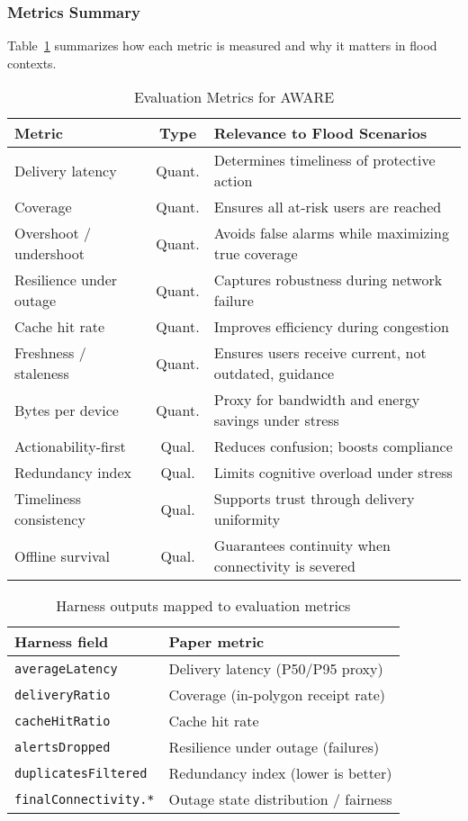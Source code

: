 \documentclass[11pt,twocolumn]{article}
\begin{document}
\subsubsection{Metrics Summary}
Table~\ref{tab:metrics} summarizes how each metric is measured and why it matters in flood contexts.

\begin{table}[t]
\centering
\footnotesize
\caption{Evaluation Metrics for AWARE}
\label{tab:metrics}
\begin{tabularx}{\linewidth}{@{}l c X@{}}
\toprule
\textbf{Metric} & \textbf{Type} & \textbf{Relevance to Flood Scenarios} \\ \midrule
Delivery latency & Quant. & Determines timeliness of protective action \\
Coverage & Quant. & Ensures all at-risk users are reached \\
Overshoot / undershoot & Quant. & Avoids false alarms while maximizing true coverage \\
Resilience under outage & Quant. & Captures robustness during network failure \\
Cache hit rate & Quant. & Improves efficiency during congestion \\
Freshness / staleness & Quant. & Ensures users receive current, not outdated, guidance \\
Bytes per device & Quant. & Proxy for bandwidth and energy savings under stress \\
Actionability-first & Qual. & Reduces confusion; boosts compliance \\
Redundancy index & Qual. & Limits cognitive overload under stress \\
Timeliness consistency & Qual. & Supports trust through delivery uniformity \\
Offline survival & Qual. & Guarantees continuity when connectivity is severed \\
\bottomrule
\end{tabularx}
\vspace{-4pt}
\end{table}


\begin{table}[t]
\centering
\footnotesize
\caption{Harness outputs mapped to evaluation metrics}
\label{tab:harness-mapping}
\begin{tabular}{@{}l l@{}}
\toprule
Harness field & Paper metric \\ \midrule
\texttt{averageLatency} & Delivery latency (P50/P95 proxy) \\
\texttt{deliveryRatio} & Coverage (in-polygon receipt rate) \\
\texttt{cacheHitRatio} & Cache hit rate \\
\texttt{alertsDropped} & Resilience under outage (failures) \\
\texttt{duplicatesFiltered} & Redundancy index (lower is better) \\
\texttt{finalConnectivity.*} & Outage state distribution / fairness \\
\bottomrule
\end{tabular}
\vspace{-4pt}
\end{table}
\end{document}
